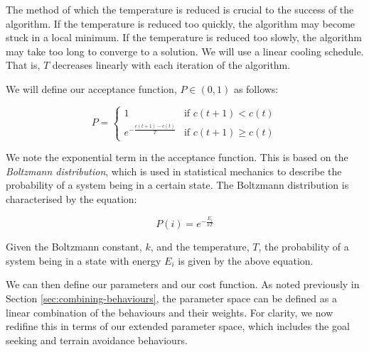 \documentclass[12pt]{article}
\begin{document}
The method of which the temperature is reduced is crucial to the success of the algorithm. If the temperature is reduced too quickly, the algorithm may become stuck in a local minimum. If the temperature is reduced too slowly, the algorithm may take too long to converge to a solution. We will use a linear cooling schedule. That is, $T$ decreases linearly with each iteration of the algorithm.

We will define our acceptance function, $P \in (0,1)$ as follows:

\begin{equation}
    P = \begin{cases}
        1 & \text{if } c(t+1) < c(t) \\
        e^{-\frac{c(t+1) - c(t)}{T}} & \text{if } c(t+1) \geq c(t)
    \end{cases}
\end{equation}

We note the exponential term in the acceptance function. This is based on the \emph{Boltzmann distribution}, which is used in statistical mechanics to describe the probability of a system being in a certain state. The Boltzmann distribution is characterised by the equation:

\begin{equation}
    P(i) = e^{-\frac{E_i}{kT}}
\end{equation}

Given the Boltzmann constant, $k$, and the temperature, $T$, the probability of a system being in a state with energy $E_i$ is given by the above equation.


We can then define our parameters and our cost function. As noted previously in Section \ref{sec:combining-behaviours}, the parameter space can be defined as a linear combination of the behaviours and their weights. For clarity, we now redifine this in terms of our extended parameter space, which includes the goal seeking and terrain avoidance behaviours.
\end{document}
